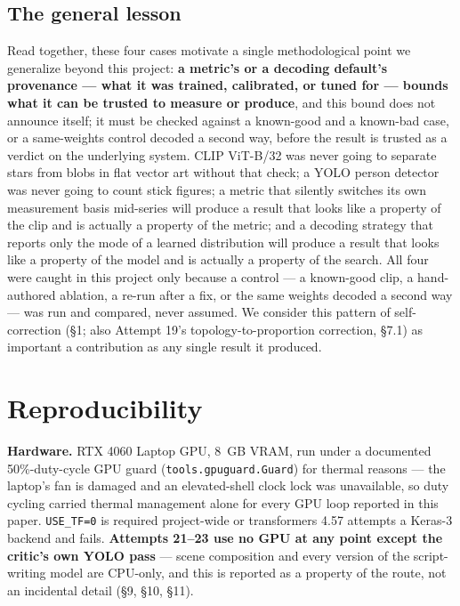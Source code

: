 \documentclass[11pt]{article}
\newcommand{\secsym}{\S}
\begin{document}
\subsection{The general lesson}
\label{sec:generallesson}

Read together, these four cases motivate a single methodological point we
generalize beyond this project: \textbf{a metric's or a decoding
default's provenance --- what it was trained, calibrated, or tuned for
--- bounds what it can be trusted to measure or produce}, and this bound
does not announce itself; it must be checked against a known-good and a
known-bad case, or a same-weights control decoded a second way, before
the result is trusted as a verdict on the underlying system. CLIP ViT-B/32
was never going to separate stars from blobs in flat vector art without
that check; a YOLO person detector was never going to count stick
figures; a metric that silently switches its own measurement basis
mid-series will produce a result that looks like a property of the clip
and is actually a property of the metric; and a decoding strategy that
reports only the mode of a learned distribution will produce a result
that looks like a property of the model and is actually a property of the
search. All four were caught in this project only because a control --- a
known-good clip, a hand-authored ablation, a re-run after a fix, or the
same weights decoded a second way --- was run and compared, never
assumed. We consider this pattern of self-correction (\secsym1; also
Attempt 19's topology-to-proportion correction, \secsym7.1) as important a
contribution as any single result it produced.

\section{Reproducibility}
\label{sec:repro}

\textbf{Hardware.} RTX 4060 Laptop GPU, 8~GB VRAM, run under a documented
50\%-duty-cycle GPU guard (\texttt{tools.gpuguard.Guard}) for thermal
reasons --- the laptop's fan is damaged and an elevated-shell clock lock
was unavailable, so duty cycling carried thermal management alone for
every GPU loop reported in this paper. \texttt{USE\_TF=0} is required
project-wide or transformers 4.57 attempts a Keras-3 backend and fails.
\textbf{Attempts 21--23 use no GPU at any point except the critic's own
YOLO pass} --- scene composition and every version of the script-writing
model are CPU-only, and this is reported as a property of the route, not
an incidental detail (\secsym9, \secsym10, \secsym11).
\end{document}
